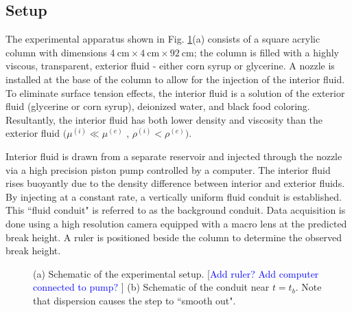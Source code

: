 \documentclass{jfm}
\newcommand{\MM}[1]{[\textcolor{blue}{#1 }]}
\begin{document}
\subsection{Setup}
The experimental apparatus shown in Fig. \ref{fig:expsys}(a) consists of a square acrylic column with dimensions  $\SI{4}{\centi\meter} \times \SI{4}{\centi\meter} \times \SI{92}{\centi\meter}$; the column is filled with a highly viscous, transparent, exterior fluid - either corn syrup or glycerine.
A nozzle is installed at the base of the column to allow for the injection of the interior fluid. To eliminate surface tension effects, the interior fluid is a solution of the exterior fluid (glycerine or corn syrup), deionized water, and black food coloring.
Resultantly, the interior fluid has both lower density and viscosity than the exterior fluid $(\mu^{(i)} \ll \mu^{(e)}$ , $\rho^{(i)} < \rho^{(e)})$.

Interior fluid is drawn from a separate reservoir and injected through the nozzle via a high precision piston pump controlled by a computer.
The interior fluid rises buoyantly due to the density difference between interior and exterior fluids. By injecting at a constant rate, a vertically uniform fluid conduit is established. This ``fluid conduit" is referred to as the background conduit.
Data acquisition is done using a high resolution camera equipped with a macro lens at the predicted break height.
A ruler is positioned beside the column to determine the observed break height.

\begin{figure}
\centering
{}
\caption{(a) Schematic of the experimental setup. \MM{Add ruler? Add computer connected to pump?} (b) Schematic of the conduit near $t=t_b$. Note that dispersion causes the step to ``smooth out".}
\label{fig:expsys}
\end{figure}
\end{document}

